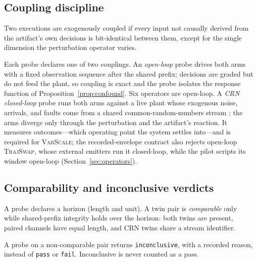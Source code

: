 \documentclass[sigconf,review,anonymous]{acmart}
\begin{document}
	\subsection{Coupling discipline}
	
	\begin{definition}
		Two executions are exogenously coupled if every input not causally derived
		from the artifact's own decisions is bit-identical between them, except for
		the single dimension the perturbation operator varies.
	\end{definition}
	
	Each probe declares one of two couplings. An \emph{open-loop} probe drives
	both arms with a fixed observation sequence after the shared prefix;
	decisions are graded but do not feed the plant, so coupling is exact and
	the probe isolates the response function of
	Proposition~\ref{prop:confound}. Six operators are open-loop. A
	\emph{CRN closed-loop} probe runs both arms against a live plant whose
	exogenous noise, arrivals, and faults come from a shared
	common-random-numbers stream \cite{glasserman1992}; the arms diverge only
	through the perturbation and the artifact's reaction. It measures
	outcomes---which operating point the system settles into---and is
	required for \textsc{VarScale}; the recorded-envelope contract also
	rejects open-loop \textsc{TrajSwap}, whose external emitters run it
	closed-loop, while the pilot scripts its window open-loop
	(Section~\ref{sec:operators}).
	
	\subsection{Comparability and inconclusive verdicts}
	
	\begin{definition}[Comparability]
		\label{def:horizon}
		A probe declares a horizon (length and unit). A twin pair is
		\emph{comparable} only while shared-prefix integrity holds over the
		horizon: both twins are present, paired channels have equal length,
		and CRN twins share a stream identifier.
	\end{definition}
	
	\begin{definition}
		\label{def:inconclusive}
		A probe on a non-comparable pair returns \texttt{inconclusive}, with a
		recorded reason, instead of \texttt{pass} or \texttt{fail}. Inconclusive
		is never counted as a pass.
	\end{definition}
	
\end{document}
